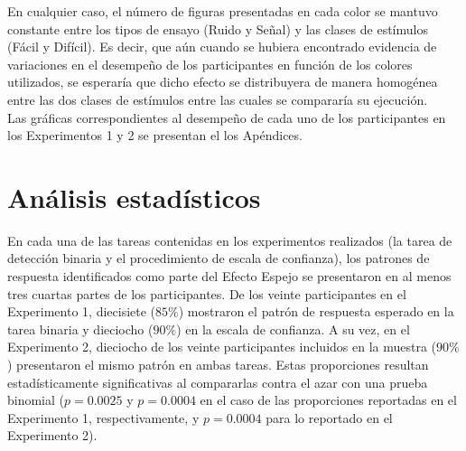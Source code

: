 En cualquier caso, el número de figuras presentadas en cada color se mantuvo constante entre los tipos de ensayo (Ruido y Señal) y las clases de estímulos (Fácil y Difícil). Es decir, que aún cuando se hubiera encontrado evidencia de variaciones en el desempeño de los participantes en función de los colores utilizados, se esperaría que dicho efecto se distribuyera de manera homogénea entre las dos clases de estímulos entre las cuales se compararía su ejecución.\\

Las gráficas correspondientes al desempeño de cada uno de los participantes en los Experimentos 1 y 2 se presentan el los Apéndices.\\




































\section{Análisis estadísticos}

En cada una de las tareas contenidas en los experimentos realizados (la tarea de detección binaria y el procedimiento de escala de confianza), los patrones de respuesta identificados como parte del Efecto Espejo se presentaron en al menos tres cuartas partes de los participantes. De los veinte participantes en el Experimento 1, diecisiete ($85\%$) mostraron el patrón de respuesta esperado en la tarea binaria y dieciocho ($90\%$) en la escala de confianza. A su vez, en el Experimento 2, dieciocho de los veinte participantes incluidos en la muestra ($90\%$) presentaron el mismo patrón en ambas tareas. Estas proporciones resultan estadísticamente significativas al compararlas contra el azar con una prueba binomial ($p=0.0025$ y $p=0.0004$ en el caso de las proporciones reportadas en el Experimento 1, respectivamente, y $p=0.0004$ para lo reportado en el Experimento 2).\\

